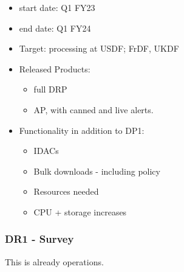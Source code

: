 \begin{itemize}

\item start date: Q1 \gls{FY23}

\item end date: Q1 \gls{FY24}

\item Target: processing at \gls{USDF}; FrDF, UKDF

\item Released Products:

  \begin{itemize}

  \item full \gls{DRP}

  \item \gls{AP}, with canned and live alerts.
    
  \end{itemize}
  

\item Functionality in addition to \gls{DP1}:

  \begin{itemize}
    
  \item IDACs
    
  \item Bulk downloads - including policy
    
  \item Resources needed
    
  \item \gls{CPU} + storage increases

  \end{itemize}

\end{itemize}

\subsubsection{DR1 - Survey}

This is already operations.

